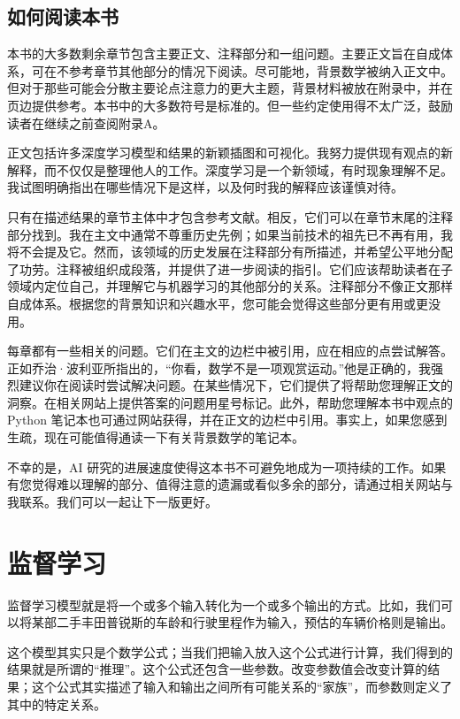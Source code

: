 \documentclass[lang=cn,newtx,10pt,scheme=chinese]{elegantbook}
\begin{document}
\section{如何阅读本书}
本书的大多数剩余章节包含主要正文、注释部分和一组问题。主要正文旨在自成体系，可在不参考章节其他部分的情况下阅读。尽可能地，背景数学被纳入正文中。但对于那些可能会分散主要论点注意力的更大主题，背景材料被放在附录中，并在页边提供参考。本书中的大多数符号是标准的。但一些约定使用得不太广泛，鼓励读者在继续之前查阅附录A。

正文包括许多深度学习模型和结果的新颖插图和可视化。我努力提供现有观点的新解释，而不仅仅是整理他人的工作。深度学习是一个新领域，有时现象理解不足。我试图明确指出在哪些情况下是这样，以及何时我的解释应该谨慎对待。

只有在描述结果的章节主体中才包含参考文献。相反，它们可以在章节末尾的注释部分找到。我在主文中通常不尊重历史先例；如果当前技术的祖先已不再有用，我将不会提及它。然而，该领域的历史发展在注释部分有所描述，并希望公平地分配了功劳。注释被组织成段落，并提供了进一步阅读的指引。它们应该帮助读者在子领域内定位自己，并理解它与机器学习的其他部分的关系。注释部分不像正文那样自成体系。根据您的背景知识和兴趣水平，您可能会觉得这些部分更有用或更没用。

每章都有一些相关的问题。它们在主文的边栏中被引用，应在相应的点尝试解答。正如乔治·波利亚所指出的，“你看，数学不是一项观赏运动。”他是正确的，我强烈建议你在阅读时尝试解决问题。在某些情况下，它们提供了将帮助您理解正文的洞察。在相关网站上提供答案的问题用星号标记。此外，帮助您理解本书中观点的 Python 笔记本也可通过网站获得，并在正文的边栏中引用。事实上，如果您感到生疏，现在可能值得通读一下有关背景数学的笔记本。

不幸的是，AI 研究的进展速度使得这本书不可避免地成为一项持续的工作。如果有您觉得难以理解的部分、值得注意的遗漏或看似多余的部分，请通过相关网站与我联系。我们可以一起让下一版更好。

\chapter{监督学习}

监督学习模型就是将一个或多个输入转化为一个或多个输出的方式。比如，我们可以将某部二手丰田普锐斯的车龄和行驶里程作为输入，预估的车辆价格则是输出。

这个模型其实只是个数学公式；当我们把输入放入这个公式进行计算，我们得到的结果就是所谓的“推理”。这个公式还包含一些参数。改变参数值会改变计算的结果；这个公式其实描述了输入和输出之间所有可能关系的“家族”，而参数则定义了其中的特定关系。
\end{document}
